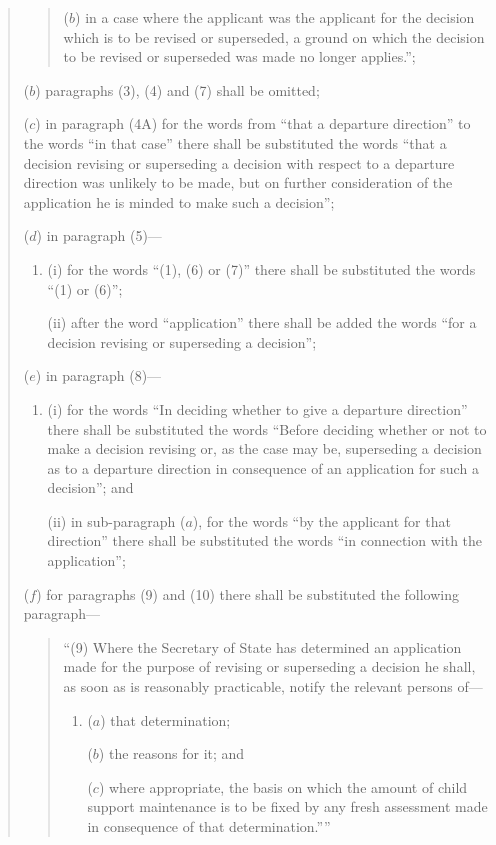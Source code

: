 \documentclass[12pt,a4paper]{article}
\begin{document}
\begin{quotation}
\begin{enumerate}
\begin{quotation}
\begin{enumerate}
($b$) in a case where the applicant was the applicant for the decision which is to be revised or superseded, a ground on which the decision to be revised or superseded was made no longer applies.”;
\end{enumerate}
\end{quotation}

($b$) paragraphs (3), (4) and (7) shall be omitted;

($c$) in paragraph (4A) for the words from “that a departure direction” to the words “in that case” there shall be substituted the words “that a decision revising or superseding a decision with respect to a departure direction was unlikely to be made, but on further consideration of the application he is minded to make such a decision”;

($d$) in paragraph (5)---
\begin{enumerate}\item[]
(i) for the words “(1), (6) or (7)” there shall be substituted the words “(1) or (6)”;

(ii) after the word “application” there shall be added the words “for a decision revising or superseding a decision”;
\end{enumerate}

($e$) in paragraph (8)---
\begin{enumerate}\item[]
(i) for the words “In deciding whether to give a departure direction” there shall be substituted the words “Before deciding whether or not to make a decision revising or, as the case may be, superseding a decision as to a departure direction in consequence of an application for such a decision”; and

(ii) in sub-paragraph ($a$), for the words “by the applicant for that direction” there shall be substituted the words “in connection with the application”;
\end{enumerate}

($f$) for paragraphs (9) and (10) there shall be substituted the following paragraph---
\begin{quotation}
“(9) Where the Secretary of State has determined an application made for the purpose of revising or superseding a decision he shall, as soon as is reasonably practicable, notify the relevant persons of---
\begin{enumerate}\item[]
($a$) that determination;

($b$) the reasons for it; and

($c$) where appropriate, the basis on which the amount of child support maintenance is to be fixed by any fresh assessment made in consequence of that determination.””
\end{enumerate}
\end{quotation}
\end{enumerate}
\end{quotation}
\end{document}
